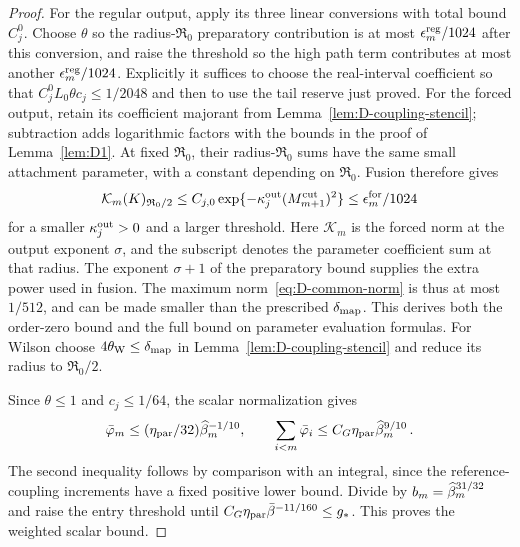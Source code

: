 \begin{proof}
For the regular output, apply its three linear conversions with total bound $C_j^0$. Choose $\theta$ so the radius-$\mathfrak R_0$ preparatory contribution is at most $\epsilon_m^{\rm reg}/1024$ after this conversion, and raise the threshold so the high path term contributes at most another $\epsilon_m^{\rm reg}/1024$. Explicitly it suffices to choose the real-interval coefficient so that $C_j^0 L_0\theta c_j\le1/2048$ and then to use the tail reserve just proved. For the forced output, retain its coefficient majorant from Lemma~\ref{lem:D-coupling-stencil}; subtraction adds logarithmic factors with the bounds in the proof of Lemma~\ref{lem:D1}. At fixed $\mathfrak R_0$, their radius-$\mathfrak R_0$ sums have the same small attachment parameter, with a constant depending on $\mathfrak R_0$. Fusion therefore gives
\begin{equation*}
\mathcal K_m(K)_{\mathfrak R_0/2}
\le C_{j,0}\exp\{-\kappa_j^{\rm out}(M^{\mathrm{cut}}_{m+1})^2\}
\le\epsilon_m^{\rm for}/1024
\end{equation*}
for a smaller $\kappa_j^{\rm out}>0$ and a larger threshold. Here $\mathcal K_m$ is the forced norm at the output exponent $\sigma$, and the subscript denotes the parameter coefficient sum at that radius. The exponent $\sigma+1$ of the preparatory bound supplies the extra power used in fusion. The maximum norm~\eqref{eq:D-common-norm} is thus at most $1/512$, and can be made smaller than the prescribed $\delta_{\rm map}$. This derives both the order-zero bound and the full bound on parameter evaluation formulas. For Wilson choose $4\theta_{\rm W}\le\delta_{\rm map}$ in Lemma~\ref{lem:D-coupling-stencil} and reduce its radius to $\mathfrak R_0/2$.

Since $\theta\le1$ and $c_j\le1/64$, the scalar normalization gives
\begin{equation*}
\bar\varphi_m\le(\eta_{\rm par}/32)\widehat{\beta}_m^{-1/10},\qquad
\sum_{i<m}\bar\varphi_i\le C_G\eta_{\rm par}\widehat{\beta}_m^{9/10}\,.
\end{equation*}
The second inequality follows by comparison with an integral, since the reference-coupling increments have a fixed positive lower bound. Divide by $b_m=\widehat{\beta}_m^{31/32}$ and raise the entry threshold until $C_G\eta_{\rm par}\bar\beta^{-11/160}\le g_*$. This proves the weighted scalar bound.
\end{proof}



